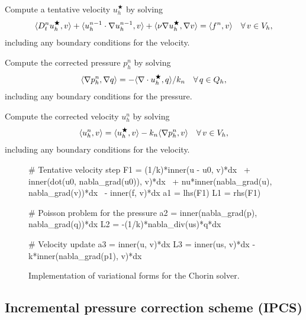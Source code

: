 {
\item
  Compute a tentative velocity $u_h^\bigstar$ by solving
  \begin{equation}\label{eq:chorin,1}
    \renni{v}{D_t^n u_h^\bigstar}
    + \renni{v}{u_h^{n-1} \cdot \nabla u_h^{n-1}}
    + \renni{\nabla v}{\nu \nabla u_h^{\bigstar}}
    = \renni{v}{f^n} \quad \foralls v \in V_h,
  \end{equation}
  including any boundary conditions for the velocity.

\item
  Compute the corrected pressure $p_h^n$ by solving
  \begin{equation}\label{eq:chorin,2}
    \renni{\nabla q}{\nabla p_h^n}
    = -\renni{q}{\nabla \cdot u_h^{\bigstar}} / k_n \quad \foralls q \in Q_h,
  \end{equation}
  including any boundary conditions for the pressure.

\item
  Compute the corrected velocity $u_h^n$ by solving
  \begin{equation}\label{eq:chorin,3}
    \renni{v}{u_h^n} = \renni{v}{u_h^{\bigstar}} - k_n \renni{v}{\nabla p_h^n}
    \quad \foralls v \in V_h,
  \end{equation}
  including any boundary conditions for the velocity.
}

\begin{figure}
\bwfig
    \begin{python}
# Tentative velocity step
F1 = (1/k)*inner(u - u0, v)*dx \
   + inner(dot(u0, nabla_grad(u0)), v)*dx \
   + nu*inner(nabla_grad(u), nabla_grad(v))*dx \
   - inner(f, v)*dx
a1 = lhs(F1)
L1 = rhs(F1)

# Poisson problem for the pressure
a2 = inner(nabla_grad(p), nabla_grad(q))*dx
L2 = -(1/k)*nabla_div(us)*q*dx

# Velocity update
a3 = inner(u, v)*dx
L3 = inner(us, v)*dx - k*inner(nabla_grad(p1), v)*dx
    \end{python}
    \caption{Implementation of variational forms for the Chorin solver.}
    \label{fig:chorin_code}
\end{figure}

\subsection{Incremental pressure correction scheme (IPCS)}
\label{sec:ipcs}

